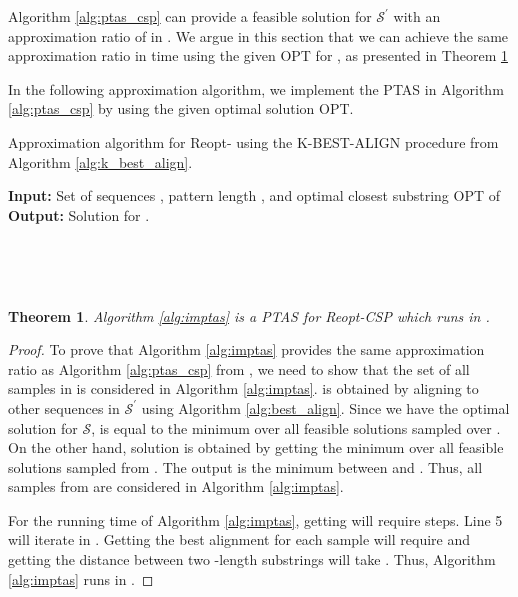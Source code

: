 \documentclass[journal]{acm_proc_article-sp}
\newtheorem{theorem}{Theorem}
\def\S{\ensuremath{\mathcal{S}}\xspace}
\def\Sp{\ensuremath{\mathcal{S}^\prime}\xspace}
\begin{document}
Algorithm \ref{alg:ptas_csp} can provide a feasible solution for \Sp with an approximation ratio of   in . We argue in this section that we can achieve the same approximation ratio in  time using the given OPT for , as presented in Theorem \ref{thm:imptas}

 
In the following approximation algorithm, we implement the PTAS in Algorithm \ref{alg:ptas_csp} by using the given optimal solution OPT.

\begin{algorithm}
\caption{Approximation algorithm for Reopt- using the K-BEST-ALIGN procedure from Algorithm \ref{alg:k_best_align}.}
\label{alg:imptas}
\noindent \textbf{Input: } Set of sequences , pattern length , and optimal closest substring OPT of  \\
\textbf{Output:}  Solution  for .\\

\begin{algorithmic}[1]
\State{} \\

\State{}
\State{}

\If{ }
\State{}
\State{}
\EndIf
\EndFor \\

\If{}
\Else{}
\EndIf
\end{algorithmic} 
\end{algorithm}

\begin{theorem}
\label{thm:imptas}
Algorithm \ref{alg:imptas} is a  PTAS for  Reopt-CSP  which runs in .
\end{theorem} \vspace{3pt}

\begin{proof}
To prove that Algorithm \ref{alg:imptas} provides the same approximation ratio as Algorithm \ref{alg:ptas_csp}  from \cite{Li1999}, we need to show that the set of all samples in  is considered in Algorithm \ref{alg:imptas}.  is obtained by aligning   to  other sequences in \Sp using Algorithm \ref{alg:best_align}. Since we have the optimal solution for \S,   is equal to the minimum over all feasible solutions sampled over . On the other hand,  solution  is obtained by getting the minimum over all feasible solutions sampled from . The output  is the minimum between  and . Thus, all samples from  are considered   in Algorithm \ref{alg:imptas}.

For the running time of Algorithm \ref{alg:imptas}, getting  will require  steps. Line 5 will iterate in .  Getting the best alignment for each sample will require  and getting the distance between two -length substrings will take . Thus, Algorithm \ref{alg:imptas} runs in .
\end{proof}
\end{document}
